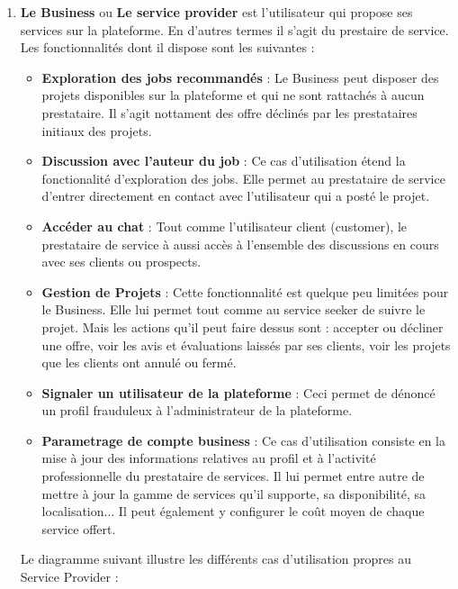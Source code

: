 {\begin{enumerate}
    \item \textbf{Le Business} ou \textbf{Le service provider} est l'utilisateur qui propose ses services sur la plateforme. En d'autres termes il s'agit du prestaire de service. Les fonctionnalités dont il dispose sont les suivantes :
    \vspace{0.39cm}
        \begin{itemize}
            \item \textbf{Exploration des jobs recommandés} : Le Business peut disposer des projets disponibles sur la plateforme et qui ne sont rattachés à aucun prestataire. Il s'agit nottament des offre déclinés par les prestataires initiaux des projets.
            \item \textbf{Discussion avec l'auteur du job} : Ce cas d'utilisation étend la fonctionalité d'exploration des jobs. Elle permet au prestataire de service d'entrer directement en contact avec l'utilisateur qui a posté le projet. 
            \item \textbf{Accéder au chat} : Tout comme l'utilisateur client (customer), le prestataire de service à aussi accès à l'ensemble des discussions en cours avec ses clients ou prospects.
            \item \textbf{Gestion de Projets} : Cette fonctionnalité est quelque peu limitées pour le Business. Elle lui permet tout comme au service seeker de suivre le projet. Mais les actions qu'il peut faire dessus sont : accepter ou décliner une offre, voir les avis et évaluations laissés par ses clients, voir les projets que les clients ont annulé ou fermé. 
            \item \textbf{Signaler un utilisateur de la plateforme} : Ceci permet de dénoncé un profil frauduleux à l'administrateur de la plateforme.
            \item \textbf{Parametrage de compte business} : Ce cas d'utilisation consiste en la mise à jour des informations relatives au profil et à l'activité professionnelle du prestataire de services. Il lui permet entre autre de mettre à jour la gamme de services qu'il supporte, sa disponibilité, sa localisation... Il peut également y configurer le coût moyen de chaque service offert.
        \end{itemize}
        
        \vspace{0.39cm}

        Le diagramme suivant illustre les différents cas d’utilisation
propres au Service Provider :


\end{enumerate}}
